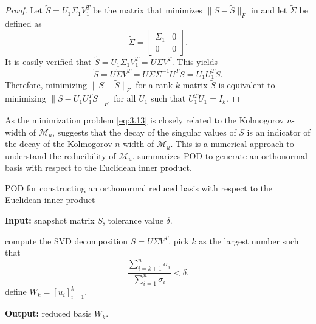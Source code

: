 \begin{proof}
Let $\tilde S = U_1 \Sigma_1 V_1^T$ be the matrix that minimizes $\| S - \tilde S \|_F$ in  and let $\tilde \Sigma$ be defined as
\begin{equation} \label{eq:3.17}
	\tilde \Sigma =
	\begin{bmatrix}
		\Sigma_1 & 0 \\
		0 & 0
	\end{bmatrix}.	
\end{equation}
It is easily verified that $\tilde S = U_1 \Sigma_1 V_1^T = U \tilde \Sigma V^T$. This yields
\begin{equation} \label{eq:3.18}
	\tilde S =  U \tilde \Sigma V^T = U \tilde \Sigma \Sigma^{-1} U^T S = U_1 U_1^T S.
\end{equation}
Therefore, minimizing $\| S - \tilde S \|_F$ for a rank $k$ matrix $\tilde S$ is equivalent to minimizing $\| S - U_1U_1^T S \|_F$ for all $U_1$ such that $U_1^T U_1 = I_k$.
\end{proof}
As the minimization problem \eqref{eq:3.13} is closely related to the Kolmogorov $n$-width of $\mathcal M_u$,  suggests that the decay of the singular values of $S$ is an indicator of the decay of the Kolmogorov $n$-width of $\mathcal M_u$. This is a numerical approach to understand the reducibility of $\mathcal M_u$.  summarizes POD to generate an orthonormal basis with respect to the Euclidean inner product.

\begin{algorithm} 
	\caption{POD for constructing an orthonormal reduced basis with respect to the Euclidean inner product} \label{alg:3.1}
	\textbf{Input:} snapshot matrix $S$, tolerance value $\delta$.
	\begin{algorithmic} [1]
		\State compute the SVD decomposition $S = U \Sigma V^T$.
		\State pick $k$ as the largest number such that
		\[
			\frac{\sum_{i=k+1}^n \sigma_i}{\sum_{i=1}^n \sigma_i} < \delta.
		\]
		\State define $W_k = [u_i]_{i=1}^k$.
	\end{algorithmic}
	\vspace{0.5cm}
	\textbf{Output:} reduced basis $W_k$.
\end{algorithm}

